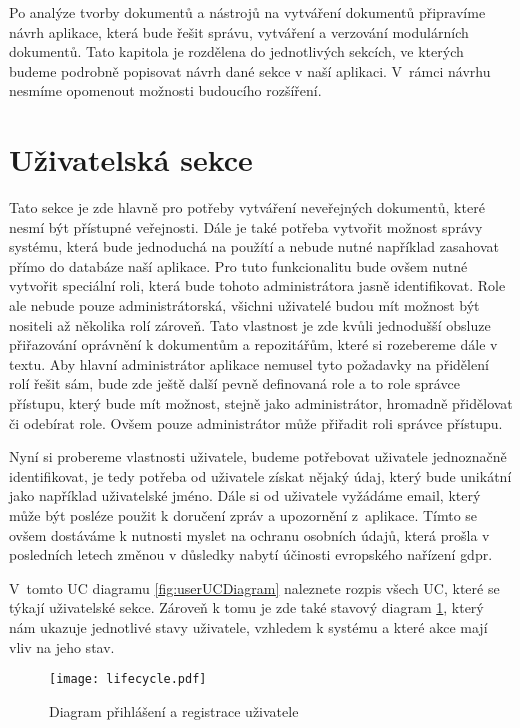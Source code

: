 Po analýze tvorby dokumentů a nástrojů na vytváření dokumentů připravíme návrh aplikace, která bude řešit správu, vytváření a verzování
modulárních dokumentů. Tato kapitola je rozdělena do jednotlivých sekcích, ve kterých budeme podrobně popisovat návrh dané sekce v naší aplikaci.
V~rámci návrhu nesmíme opomenout možnosti budoucího rozšíření.

\section{Uživatelská sekce}

Tato sekce je zde hlavně pro potřeby vytváření neveřejných dokumentů, které nesmí být přístupné veřejnosti. Dále je také potřeba vytvořit možnost
správy systému, která bude jednoduchá na použítí a nebude nutné například zasahovat přímo do databáze naší aplikace. Pro tuto funkcionalitu bude ovšem
nutné vytvořit speciální roli, která bude tohoto administrátora jasně identifikovat. Role ale nebude pouze administrátorská, všichni uživatelé budou mít
možnost být nositeli až několika rolí zároveň. Tato vlastnost je zde kvůli jednodušší obsluze přiřazování oprávnění k dokumentům a repozitářům, které si rozebereme
dále v textu. Aby hlavní administrátor aplikace nemusel tyto požadavky na přidělení rolí řešit sám, bude zde ještě další pevně definovaná role a to role
správce přístupu, který bude mít možnost, stejně jako administrátor, hromadně přidělovat či odebírat role. Ovšem pouze administrátor může přiřadit roli správce přístupu.

Nyní si probereme vlastnosti uživatele, budeme potřebovat uživatele jednoznačně identifikovat, je tedy potřeba od uživatele získat nějaký údaj, který bude unikátní
jako například uživatelské jméno. Dále si od uživatele vyžádáme email, který může být posléze použit k doručení zpráv a upozornění z~aplikace. Tímto se ovšem
dostáváme k nutnosti myslet na ochranu osobních údajů, která prošla v posledních letech změnou v důsledky nabytí účinosti evropského nařízení \gls{gdpr}.

V~tomto UC diagramu \ref{fig:userUCDiagram} naleznete rozpis všech UC, které se týkají uživatelské sekce. Zároveň k tomu je zde také stavový diagram \ref{fig:userFlow},
který nám ukazuje jednotlivé stavy uživatele, vzhledem k systému a které akce mají vliv na jeho stav.

\begin{figure}[H]
    \centering
    \texttt{[image: lifecycle.pdf]}
    \caption{Diagram přihlášení a registrace uživatele}
    \label{fig:userFlow}
\end{figure}

